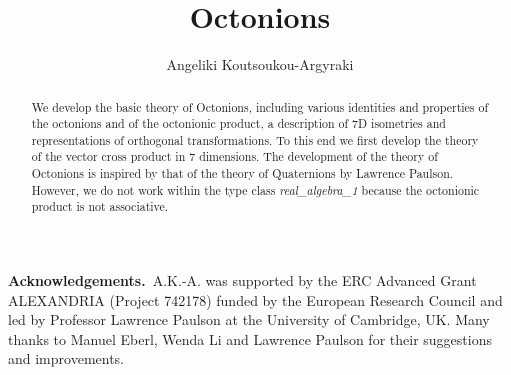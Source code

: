 \documentclass[11pt,a4paper]{article}
\begin{document}
\title{Octonions}
\author{Angeliki Koutsoukou-Argyraki}
\maketitle

\begin{abstract}
We develop the basic theory of Octonions, including various identities and properties of the
octonions and of the octonionic product, a description of 7D isometries and representations
of orthogonal transformations. To this end we first develop the theory of the vector cross product 
in 7 dimensions. The development of the theory of Octonions is inspired by that of the theory of
Quaternions by Lawrence Paulson. However, we do not work within the type class 
\textit{real\_algebra\_1} because the octonionic product is not associative.
\end{abstract}

\newpage
\tableofcontents
\newpage

\noindent\textbf{Acknowledgements.}\ A.K.-A. was supported by the ERC Advanced Grant ALEXANDRIA (Project 742178) funded
by the European Research Council and led by Professor Lawrence Paulson at the University 
of Cambridge, UK. Many thanks to Manuel Eberl, Wenda Li and Lawrence Paulson for their
suggestions and improvements.



\nocite{*}


\end{document}
